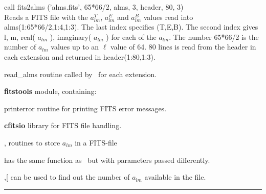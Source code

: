 \begin{example}
{
call fits2alms ('alms.fits', 65*66/2, alms, 3, header, 80, 3)  \\
}
{
Reads a FITS file with the $a_{lm}^T$, $a_{lm}^E$ and $a_{lm}^B$ values read into alms(1:65*66/2,1:4,1:3). The last index specifies (T,E,B). The second index gives l, m, real( $a_{lm}$ ), imaginary( $a_{lm}$ ) for each of the $a_{lm}$. The number 65*66/2 is the number of  $a_{lm}$  values up to an $\ell$ value of 64. 80 lines is read from the header in each extension and returned in header(1:80,1:3).
}
\end{example}

\begin{modules}
  \begin{sulist}{} %
  \item[read\_alms] routine called by \thedocid\ for each extension.
  \item[\textbf{fitstools}] module, containing:
  \item[printerror] routine for printing FITS error messages.
  \item[\textbf{cfitsio}] library for FITS file handling.		
  \end{sulist}
\end{modules}
\newpage
\begin{related}
  \begin{sulist}{} %
  \item[\htmlref{alms2fits}{sub:alms2fits}, \htmlref{dump\_alms}{sub:dump_alms}] routines to store $a_{lm}$ in a FITS-file 
  \item[\htmlref{read\_conbintab}{sub:read_conbintab}] has the same function as
  \thedocid\ but with parameters passed differently.
  \item[\htmlref{number\_of\_alms}{sub:number_of_alms},[\htmlref{getsize\_fits}{sub:getsize_fits}]
  can be used to find out the number of $a_{lm}$ available in the file.
  \end{sulist}
\end{related}

\rule{\hsize}{2mm}

\newpage
